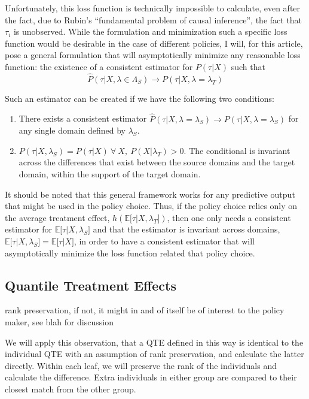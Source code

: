 \documentclass[a4paper,12pt]{article}
\begin{document}
Unfortunately, this loss function is technically impossible to calculate, even after the fact, due to Rubin's ``fundamental problem of causal inference'', the fact that $\tau_i$ is unobserved. While the formulation and minimization such a specific loss function would be desirable in the case of different policies, I will, for this article, pose a general formulation that will asymptotically minimize any reasonable loss function: the existence of a consistent estimator for $P(\tau | X)$ such that
%
$$
\hat{P}(\tau | X, \lambda \in \Lambda_S) \rightarrow P(\tau | X, \lambda = \lambda_T)
$$

Such an estimator can be created if we have the following two conditions: 

\begin{enumerate}
\item There exists a consistent estimator $\hat{P}(\tau | X, \lambda = \lambda_S) \rightarrow P(\tau | X, \lambda = \lambda_S)$ for any single domain defined by $\lambda_S$. 
\item $P(\tau | X, \lambda_S) = P(\tau | X) \ \forall \ X, \ P(X | \lambda_T) > 0$. The conditional is invariant across the differences that exist between the source domains and the target domain, within the support of the target domain. 
\end{enumerate}

It should be noted that this general framework works for any predictive output that might be used in the policy choice. Thus, if the policy choice relies only on the average treatment effect, $h(\mathbb{E} \big[ \tau | X, \lambda_T \big])$, then one only needs a consistent estimator for $\mathbb{E} \big[ \tau | X, \lambda_S \big]$ and that the estimator is invariant across domains, $\mathbb{E} \big[ \tau | X, \lambda_S \big] = \mathbb{E} \big[ \tau | X \big]$, in order to have a consistent estimator that will asymptotically minimize the loss function related that policy choice. 


\subsection*{Quantile Treatment Effects}

rank preservation, if not, it might in and of itself be of interest to the policy maker, see blah for discussion

We will apply this observation, that a QTE defined in this way is identical to the individual QTE with an assumption of rank preservation, and calculate the latter directly. Within each leaf, we will preserve the rank of the individuals and calculate the difference. Extra individuals in either group are compared to their closest match from the other group. 
\end{document}
